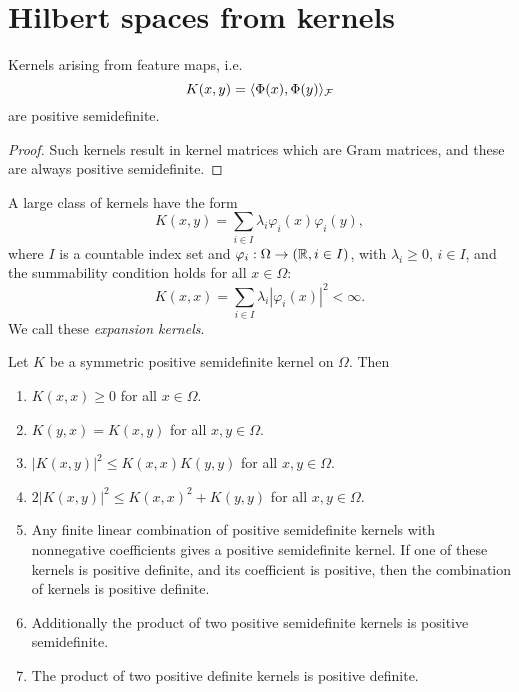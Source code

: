 \documentclass[../skript.tex]{subfiles}
\begin{document}
\section{Hilbert spaces from kernels} %
\begin{theorem} %
\label{thm:28}
Kernels arising from feature maps, i.e.
\[
	K(x, y) = \langle \Phi(x), \Phi(y) \rangle_{\mathcal{F}}
\]
are positive semidefinite.
\end{theorem}
\begin{proof}
Such kernels result in kernel matrices which are Gram matrices, and these are always positive semidefinite.
\end{proof}
\begin{remark}
A large class of kernels have the form
\[
	K(x, y) = \sum_{i \in I} \lambda_i \varphi_i(x) \varphi_i(y),
\]
where $I$ is a countable index set and $\varphi_i : \Omega \to (\mathbb{R}, i \in I)$, with $\lambda_i \geq 0$, $i \in I$, and the summability condition holds for all $x \in \Omega$:
\[
	K(x, x) = \sum_{i \in I} \lambda_i |\varphi_i(x)|^2 < \infty.
\]
We call these \emph{expansion kernels}.
\end{remark}
\begin{theorem} %
\label{thm:29}
Let $K$ be a symmetric positive semidefinite kernel on $\Omega$. Then
\begin{enumerate}
\item\label{thm:29-1}$K(x, x) \geq 0$ for all $x \in \Omega$.
\item\label{thm:29-2} $K(y, x) = K(x, y)$ for all $x, y \in \Omega$.
\item\label{thm:29-3} $|K(x, y)|^2 \leq K(x, x) K(y, y)$ for all $x, y \in \Omega$.
\item\label{thm:29-4} $2|K(x, y)|^2 \leq K(x, x)^2 + K(y, y)$ for all $x, y \in \Omega$.
\item\label{thm:29-5} Any finite linear combination of positive semidefinite kernels with nonnegative coefficients gives a positive semidefinite kernel. If one of these kernels is positive definite, and its coefficient is positive, then the combination of kernels is positive definite.
\item\label{thm:29-6} Additionally the product of two positive semidefinite kernels is positive semidefinite.
\item\label{thm:29-7} The product of two positive definite kernels is positive definite.
\end{enumerate}
\end{theorem}
\end{document}

